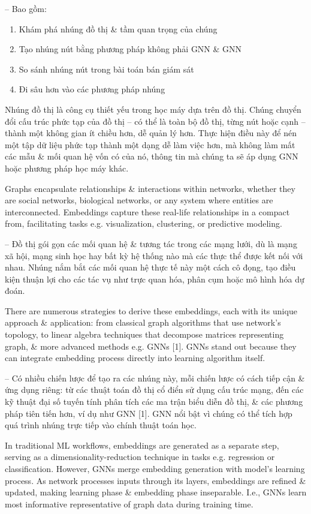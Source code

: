 \documentclass{article}
\begin{document}
\begin{itemize}
    -- Bao gồm:
    \begin{enumerate}
        \item Khám phá nhúng đồ thị \& tầm quan trọng của chúng
        \item Tạo nhúng nút bằng phương pháp không phải GNN \& GNN
        \item So sánh nhúng nút trong bài toán bán giám sát
        \item Đi sâu hơn vào các phương pháp nhúng
    \end{enumerate}
    Nhúng đồ thị là công cụ thiết yếu trong học máy dựa trên đồ thị. Chúng chuyển đổi cấu trúc phức tạp của đồ thị -- có thể là toàn bộ đồ thị, từng nút hoặc cạnh -- thành một không gian ít chiều hơn, dễ quản lý hơn. Thực hiện điều này để nén một tập dữ liệu phức tạp thành một dạng dễ làm việc hơn, mà không làm mất các mẫu \& mối quan hệ vốn có của nó, thông tin mà chúng ta sẽ áp dụng GNN hoặc phương pháp học máy khác.

    Graphs encapsulate relationships \& interactions within networks, whether they are social networks, biological networks, or any system where entities are interconnected. Embeddings capture these real-life relationships in a compact from, facilitating tasks e.g. visualization, clustering, or predictive modeling.

    -- Đồ thị gói gọn các mối quan hệ \& tương tác trong các mạng lưới, dù là mạng xã hội, mạng sinh học hay bất kỳ hệ thống nào mà các thực thể được kết nối với nhau. Nhúng nắm bắt các mối quan hệ thực tế này một cách cô đọng, tạo điều kiện thuận lợi cho các tác vụ như trực quan hóa, phân cụm hoặc mô hình hóa dự đoán.

    There are numerous strategies to derive these embeddings, each with its unique approach \& application: from classical graph algorithms that use network's topology, to linear algebra techniques that decompose matrices representing graph, \& more advanced methods e.g. GNNs [1]. GNNs stand out because they can integrate embedding process directly into learning algorithm itself.

    -- Có nhiều chiến lược để tạo ra các nhúng này, mỗi chiến lược có cách tiếp cận \& ứng dụng riêng: từ các thuật toán đồ thị cổ điển sử dụng cấu trúc mạng, đến các kỹ thuật đại số tuyến tính phân tích các ma trận biểu diễn đồ thị, \& các phương pháp tiên tiến hơn, ví dụ như GNN [1]. GNN nổi bật vì chúng có thể tích hợp quá trình nhúng trực tiếp vào chính thuật toán học.

    In traditional ML workflows, embeddings are generated as a separate step, serving as a dimensionality-reduction technique in tasks e.g. regression or classification. However, GNNs merge embedding generation with model's learning process. As network processes inputs through its layers, embeddings are refined \& updated, making learning phase \& embedding phase inseparable. I.e., GNNs learn most informative representative of graph data during training time.


\end{itemize}
\end{document}
